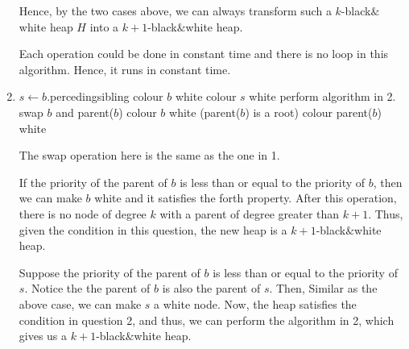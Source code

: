 \documentclass[10pt]{article}
\begin{document}
\begin{enumerate}
		Hence, by the two cases above, we can always transform such a
		$k$-black$\&$white heap $H$ into a $k+1$-black$\&$white heap.

		Each operation could be done in constant time and there is no loop in
		this algorithm.
		Hence, it runs in constant time.

	\item
	\begin{comment}
		Suppose you have a linked-list H of binomial trees that satisfies all
		the properties of a black$&$white heap except that it has one black node
		b od degree k and its parent has degree greater than $k+1$.
		Suppose that the sibling $s$ of degree $k+1$ of $b$ is black.
		Given pointers to $b$ and $s$, explain how to transform H in constant
		time into a k'-black$&$white heap with the some set of nodes, for some
		$k' > k$.
	\end{comment}

		\begin{algorithmic}[1]
			\State $s \gets b$.percedingsibling
				\State colour $b$ white
				\State colour $s$ white
				\State perform algorithm in 2.
			\Else
				\State swap $b$ and parent($b$)
				\State colour $b$ white
				\If(parent($b$) is a root)
					\State colour parent($b$) white
				\EndIf
			\EndIf
		\end{algorithmic}

		The swap operation here is the same as the one in 1.

		If the priority of the parent of $b$ is less than or equal to the
		priority of $b$, then we can make $b$ white and it satisfies the forth
		property.
		After this operation, there is no node of degree $k$ with a parent of
		degree greater than $k+1$.
		Thus, given the condition in this question, the new heap is a
		$k+1$-black$\&$white heap. 

		Suppose the priority of the parent of $b$ is less than or equal to the
		priority of $s$.
		Notice the the parent of $b$ is also the parent of $s$.
		Then, Similar as the above case, we can make $s$ a white node. 
		Now, the heap satisfies the condition in question 2, and thus, we can
		perform the algorithm in 2, which gives us a $k+1$-black$\&$white heap.


\end{enumerate}
\end{document}
